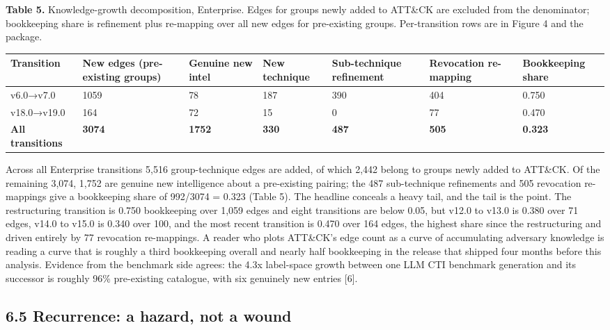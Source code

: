 \documentclass[11pt,a4paper]{article}
\begin{document}
\textbf{Table 5.} Knowledge-growth decomposition, Enterprise. Edges for groups newly added to ATT\&CK are excluded from the denominator; bookkeeping share is refinement plus re-mapping over all new edges for pre-existing groups. Per-transition rows are in Figure 4 and the package.

\begin{center}\footnotesize
\begin{tabular}{lllllll}
\toprule
Transition & New edges (pre-existing groups) & Genuine new intel & New technique & Sub-technique refinement & Revocation re-mapping & Bookkeeping share \\
\midrule
v6.0→v7.0 & 1059 & 78 & 187 & 390 & 404 & 0.750 \\
v18.0→v19.0 & 164 & 72 & 15 & 0 & 77 & 0.470 \\
\textbf{All transitions} & \textbf{3074} & \textbf{1752} & \textbf{330} & \textbf{487} & \textbf{505} & \textbf{0.323} \\
\bottomrule
\end{tabular}
\end{center}

Across all Enterprise transitions 5,516 group-technique edges are added, of which 2,442 belong to groups newly added to ATT\&CK. Of the remaining 3,074, 1,752 are genuine new intelligence about a pre-existing pairing; the 487 sub-technique refinements and 505 revocation re-mappings give a bookkeeping share of 992/3074 = 0.323 (Table 5). The headline conceals a heavy tail, and the tail is the point. The restructuring transition is 0.750 bookkeeping over 1,059 edges and eight transitions are below 0.05, but v12.0 to v13.0 is 0.380 over 71 edges, v14.0 to v15.0 is 0.340 over 100, and the most recent transition is 0.470 over 164 edges, the highest share since the restructuring and driven entirely by 77 revocation re-mappings. A reader who plots ATT\&CK's edge count as a curve of accumulating adversary knowledge is reading a curve that is roughly a third bookkeeping overall and nearly half bookkeeping in the release that shipped four months before this analysis. Evidence from the benchmark side agrees: the 4.3x label-space growth between one LLM CTI benchmark generation and its successor is roughly 96\% pre-existing catalogue, with six genuinely new entries [6].

\subsection{6.5 Recurrence: a hazard, not a wound}
\end{document}
